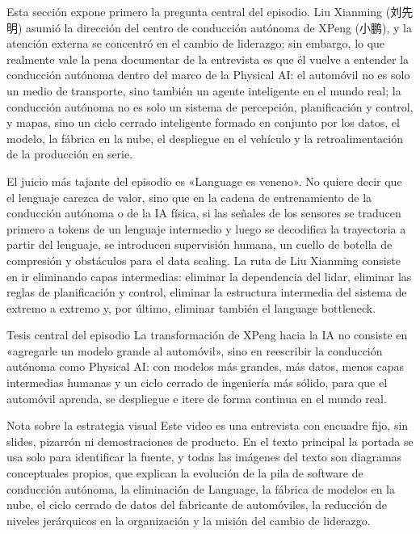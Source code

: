 \documentclass[a4paper]{article}
\begin{document}
Esta sección expone primero la pregunta central del episodio. Liu Xianming (刘先明) asumió la dirección del centro de conducción autónoma de XPeng (小鹏), y la atención externa se concentró en el cambio de liderazgo; sin embargo, lo que realmente vale la pena documentar de la entrevista es que él vuelve a entender la conducción autónoma dentro del marco de la Physical AI: el automóvil no es solo un medio de transporte, sino también un agente inteligente en el mundo real; la conducción autónoma no es solo un sistema de percepción, planificación y control, y mapas, sino un ciclo cerrado inteligente formado en conjunto por los datos, el modelo, la fábrica en la nube, el despliegue en el vehículo y la retroalimentación de la producción en serie.

El juicio más tajante del episodio es «Language es veneno». No quiere decir que el lenguaje carezca de valor, sino que en la cadena de entrenamiento de la conducción autónoma o de la IA física, si las señales de los sensores se traducen primero a tokens de un lenguaje intermedio y luego se decodifica la trayectoria a partir del lenguaje, se introducen supervisión humana, un cuello de botella de compresión y obstáculos para el data scaling. La ruta de Liu Xianming consiste en ir eliminando capas intermedias: eliminar la dependencia del lidar, eliminar las reglas de planificación y control, eliminar la estructura intermedia del sistema de extremo a extremo y, por último, eliminar también el language bottleneck.

\begin{importantbox}{Tesis central del episodio}
La transformación de XPeng hacia la IA no consiste en «agregarle un modelo grande al automóvil», sino en reescribir la conducción autónoma como Physical AI: con modelos más grandes, más datos, menos capas intermedias humanas y un ciclo cerrado de ingeniería más sólido, para que el automóvil aprenda, se despliegue e itere de forma continua en el mundo real.
\end{importantbox}

\begin{knowledgebox}{Nota sobre la estrategia visual}
Este video es una entrevista con encuadre fijo, sin slides, pizarrón ni demostraciones de producto. En el texto principal la portada se usa solo para identificar la fuente, y todas las imágenes del texto son diagramas conceptuales propios, que explican la evolución de la pila de software de conducción autónoma, la eliminación de Language, la fábrica de modelos en la nube, el ciclo cerrado de datos del fabricante de automóviles, la reducción de niveles jerárquicos en la organización y la misión del cambio de liderazgo.
\end{knowledgebox}
\end{document}
